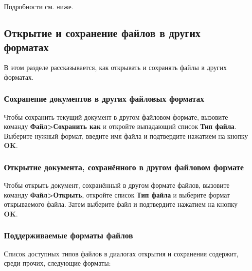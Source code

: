 ﻿\documentclass[a4paper,10pt]{article}
\begin{document}
 Подробности см. ниже.

\subsection{Открытие и сохранение файлов в других форматах}
В этом разделе рассказывается, как открывать и сохранять файлы в других форматах.

\subsubsection{Сохранение документов в других файловых форматах}
Чтобы сохранить текущий документ в другом файловом формате, вызовите команду \textbf{Файл>Сохранить как} и откройте выпадающий список \textbf{Тип файла}. Выберите нужный формат, введите имя файла и подтвердите нажатием на кнопку \textbf{OK}.

\subsubsection{Открытие документа, сохранённого в другом файловом формате}
Чтобы открыть документ, сохранённый в другом формате файлов, вызовите команду \textbf{Файл>Открыть}, откройте список \textbf{Тип файла} и выберите формат открываемого файла. Затем выберите файл и подтвердите нажатием на кнопку \textbf{OK}.

\subsubsection{Поддерживаемые форматы файлов}
Список доступных типов файлов в диалогах открытия и сохранения содержит, среди прочих, следующие форматы:
\end{document}
